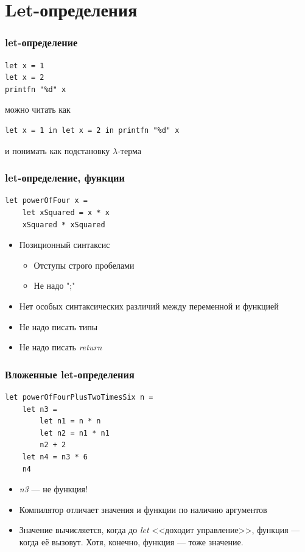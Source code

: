 \documentclass[xetex,mathserif,serif]{beamer}
\begin{document}
	\section{Let-определения}

	\begin{frame}[fragile]
		\frametitle{let-определение}
		\begin{verbatim}
let x = 1
let x = 2
printfn "%d" x
		\end{verbatim}
		можно читать как
		\begin{verbatim}
let x = 1 in let x = 2 in printfn "%d" x
		\end{verbatim}
		и понимать как подстановку $\lambda$-терма
	\end{frame}

	\begin{frame}[fragile]
		\frametitle{let-определение, функции}
		\begin{verbatim}
let powerOfFour x = 
    let xSquared = x * x
    xSquared * xSquared
		\end{verbatim}
		\begin{itemize}
			\item Позиционный синтаксис
			\begin{itemize}
				\item Отступы строго пробелами
				\item Не надо ";"
			\end{itemize}
			\item Нет особых синтаксических различий между переменной и функцией
			\item Не надо писать типы
			\item Не надо писать \textit{return}
		\end{itemize}
	\end{frame}

	\begin{frame}[fragile]
		\frametitle{Вложенные let-определения}
		\begin{verbatim}
let powerOfFourPlusTwoTimesSix n =
    let n3 =
        let n1 = n * n
        let n2 = n1 * n1
        n2 + 2
    let n4 = n3 * 6
    n4
		\end{verbatim}
		\begin{itemize}
			\item \textit{n3} --- не функция!
			\item Компилятор отличает значения и функции по наличию аргументов
			\item Значение вычисляется, когда до \textit{let} <<доходит управление>>, 
					функция --- когда её вызовут. Хотя, конечно, функция --- тоже значение.
		\end{itemize}
	\end{frame}
\end{document}
